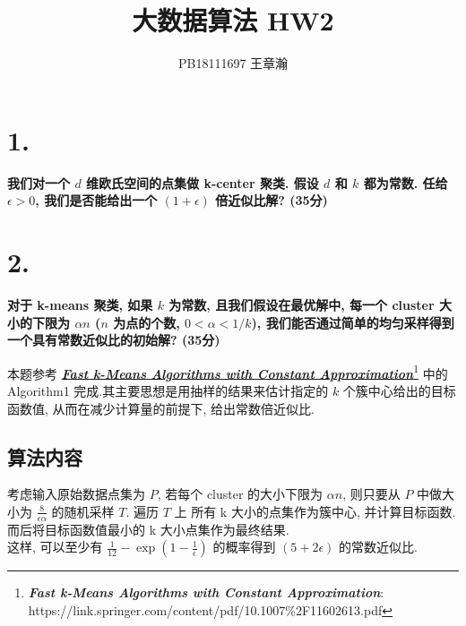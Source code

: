 \documentclass[UTF8]{article}
\title{大数据算法 HW2}
\author{PB18111697 王章瀚}
\newcommand{\jumpLine} {\hspace*{\fill} \par}
\begin{document}
\maketitle
\section*{1.}

\noindent \textbf{我们对一个 $d$ 维欧氏空间的点集做 k-center 聚类. 假设 $d$ 和 $k$ 都为常数. 任给 $\epsilon > 0$, 我们是否能给出一个 $(1 + \epsilon)$ 倍近似比解? (35分)} \\\jumpLine\noindent



\section*{2.}

\noindent \textbf{对于 k-means 聚类, 如果 $k$ 为常数, 且我们假设在最优解中, 每一个 cluster 大小的下限为 $\alpha n$ ($n$ 为点的个数, $0 < \alpha < 1/k$), 我们能否通过简单的均匀采样得到一个具有常数近似比的初始解? (35分)} \\\jumpLine\noindent
本题参考 \href{https://link.springer.com/content/pdf/10.1007\%2F11602613.pdf}{\textbf{\textit{Fast k-Means Algorithms with Constant Approximation}}}\footnote{\textbf{\textit{Fast k-Means Algorithms with Constant Approximation}}: https://link.springer.com/content/pdf/10.1007\%2F11602613.pdf}
中的 Algorithm1 完成.其主要思想是用抽样的结果来估计指定的 $k$ 个簇中心给出的目标函数值, 从而在减少计算量的前提下, 给出常数倍近似比. 

\subsection*{算法内容}
考虑输入原始数据点集为 $P$, 若每个 cluster 的大小下限为 $\alpha n$, 则只要从 $P$ 中做大小为 $\frac{8}{\epsilon\alpha}$ 的随机采样 $T$. 遍历 $T$ 上 所有 k 大小的点集作为簇中心, 并计算目标函数. 而后将目标函数值最小的 k 大小点集作为最终结果. \\
这样, 可以至少有 $\frac{1}{12} - \exp(1-\frac{1}{\epsilon})$ 的概率得到 $(5+2\epsilon)$ 的常数近似比.
\end{document}
